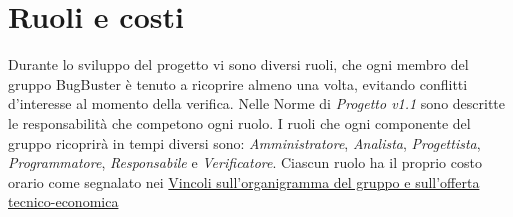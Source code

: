 \section{Ruoli e costi}
Durante lo sviluppo del progetto vi sono diversi ruoli, che ogni membro del gruppo BugBuster è tenuto a ricoprire almeno una volta, evitando conflitti d’interesse al momento della verifica. Nelle Norme di \textit{Progetto v1.1} sono descritte le responsabilità che competono ogni ruolo. I ruoli che ogni componente del gruppo ricoprirà in tempi diversi sono: \textit{Amministratore}, \textit{Analista}, \textit{Progettista}, \textit{Programmatore}, \textit{Responsabile} e \textit{Verificatore}.
Ciascun ruolo ha il proprio costo orario come segnalato nei 
\href{http://www.math.unipd.it/~tullio/IS-1/2015/Progetto/PD01b.html}{Vincoli sull’organigramma del gruppo e sull’offerta tecnico-economica}
